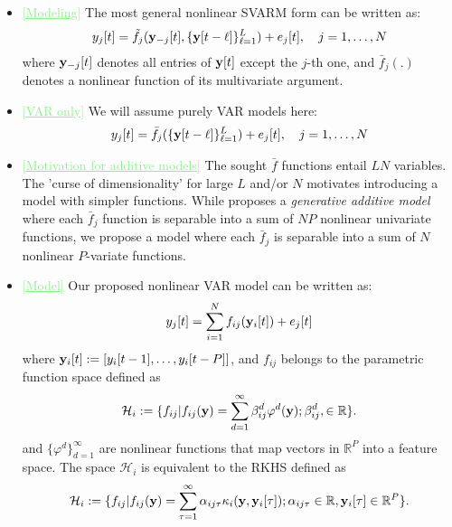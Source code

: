 \documentclass[10pt,final,onecolumn]{IEEEtran}
\newcommand{\cmt}[1]{\noindent\textcolor{lightgreen}{\underline{[#1]}}} %
\newenvironment{myitemize}{\begin{itemize}}{\end{itemize}}
\newcommand{\cmt}[1]{} %
\newenvironment{myitemize}{}{}
\begin{document}
\begin{myitemize}
\item
\cmt{Modeling}
The most general nonlinear SVARM form can be written as:
  \begin{align}
\label{eq:svar:general}
	y_{j}[t]=\tilde{f}_j(\bby_{-j}[t], \{\bby[t-\ell]\}_{\ell=1}^L)+e_{j}[t],\quad j=1,\ldots, N
\end{align}
where ${\mathbf y}_{-j}[t]$ denotes all entries of ${\mathbf y}[t]$ except the $j$-th one, and $\bar{f}_j(.)$ denotes a nonlinear function of its multivariate argument.
\item \cmt{VAR only} We will assume purely VAR models here:
\begin{align}
\label{eq:svar:general}
	y_{j}[t]=\bar{f}_j(\{\bby[t-\ell]\}_{\ell=1}^L)+e_{j}[t],\quad j=1,\ldots, N
\end{align}
\item \cmt{Motivation for additive models}
The sought $\bar{f}$ functions entail $LN$ variables. The 'curse of dimensionality' for large $L$ and/or $N$ motivates introducing a model with simpler functions.
While \cite{shen2016nonlinear} proposes a \emph{generative additive model} where each $\bar{f}_j$ function is separable into a sum of $NP$ nonlinear univariate functions, we propose a model where each $\bar{f}_j$ is separable into a sum of $N$ nonlinear $P$-variate functions.
\item {\cmt{Model}
Our proposed nonlinear VAR model can be written as:
\begin{equation}
    y_{j}[t] = \sum_{i=1}^N f_{ij}({\mathbf y}_i[t]) + e_j[t]
\end{equation}
where ${\mathbf y}_i[t] := \left[y_i[t-1], \ldots, y_i[t-P]\right]$, and $f_{ij}$ belongs to the parametric function space defined as
\begin{equation}
\label{def:parametric}
	\mathcal{H}_i:=\{f_{ij}|f_{ij}(\bby)=\sum_{d=1}^{\infty} \beta_{ij}^d{\varphi}^d(\bby); \beta_{ij}^d, \in \mathbb{R}\}.
\end{equation}
and $\{\varphi^d\}_{d=1}^\infty$ are nonlinear functions that map vectors in $\mathbb{R}^P$ into a feature space. The space $\mathcal{H}_i$ is equivalent to the RKHS defined as
\begin{equation}
\label{def:rkhs}
	\mathcal{H}_i:=\{f_{ij}|f_{ij}(\bby)=\sum_{\tau=1}^{\infty} \alpha_{ij\tau}\kappa_i(\bby, \bby_i[\tau]); \alpha_{ij\tau}\in \mathbb{R},\bby_i[\tau]\in\mathbb{R}^P  \}.

\end{equation}}
\end{myitemize}
\end{document}
